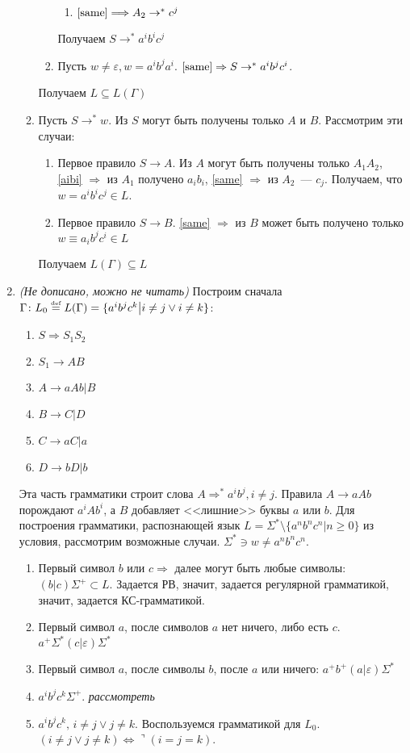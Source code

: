 \documentclass[a4paper]{article}
\def\eqdef{\overset{\mbox{\tiny def}}{=}}
\begin{document}
\begin{enumerate}
\begin{enumerate}[1.]
\begin{enumerate}
\begin{enumerate}
\item $\ref{same}\Longrightarrow A_2\rightarrow^* c^j$
\end{enumerate}
Получаем $S\rightarrow^* a^ib^ic^j$
\item Пусть $w\neq\varepsilon, w=a^ib^ja^i$. $\ref{same}\Rightarrow S\rightarrow^* a^ib^jc^i$.
\end{enumerate}
Получаем $\boxed{L\subseteq L(\Gamma)}$
\item Пусть $S\longrightarrow^* w$. Из $S$ могут быть получены только $A$ и $B$. Рассмотрим эти случаи:\begin{enumerate}
\item Первое правило $S\longrightarrow A$. Из $A$ могут быть получены только $A_1A_2$, \ref{aibi} $\Rightarrow$ из $A_1$ получено $a_ib_i$, \ref{same} $\Rightarrow$ из $A_2$~--- $c_j$. Получаем, что $w=a^ib^ic^j\in L$.
\item Первое правило $S\longrightarrow B$. \ref{same} $\Rightarrow$ из $B$ может быть получено только $w\equiv a_ib^jc^i\in L$
\end{enumerate}
Получаем $\boxed{L(\Gamma)\subseteq L}$
\end{enumerate}
\item {\em{(Не дописано, можно не читать)}} Построим сначала $\Gamma\colon L_0\eqdef L(\Gamma)=\{a^ib^jc^k\big|i\neq j\vee i\neq k\}$:
\begin{enumerate}
\item $S\Longrightarrow S_1S_2$
\item $S_1\longrightarrow AB$
\item $A\longrightarrow aAb|B$
\item $B\longrightarrow C|D$
\item $C\longrightarrow aC|a$
\item $D\longrightarrow bD|b$
\end{enumerate}
Эта часть грамматики строит слова $A\Longrightarrow^* a^ib^j,i\neq j$. Правила $A\longrightarrow aAb$ порождают $a^iAb^i$, а $B$ добавляет <<лишние>> буквы $a$ или $b$.\newline
Для построения грамматики, распознающей язык $L=\Sigma^*\setminus\{a^nb^nc^n\big|n\geqslant 0\}$ из условия, рассмотрим возможные случаи. $\Sigma^*\ni w\neq a^nb^nc^n$.\begin{enumerate}
\item Первый символ $b$ или $c\Rightarrow$ далее могут быть любые символы: $(b|c)\Sigma^+\subset L$. Задается РВ, значит, задается регулярной грамматикой, значит, задается КС-грамматикой.
\item Первый символ $a$, после символов $a$ нет ничего, либо есть $c$. $a^+\Sigma^*(c|\varepsilon)\Sigma^*$
\item Первый символ $a$, после символы $b$, после $a$ или ничего: $a^+b^+(a|\varepsilon)\Sigma^*$
\item $a^ib^jc^k\Sigma^+$. {\em{рассмотреть}}
\item $a^ib^jc^k,\,i\neq j\vee j\neq k$. Воспользуемся грамматикой для $L_0$. $(i\neq j\vee j\neq k)\Leftrightarrow \urcorner(i=j=k)$.
\end{enumerate}
\end{enumerate}
\end{document}
